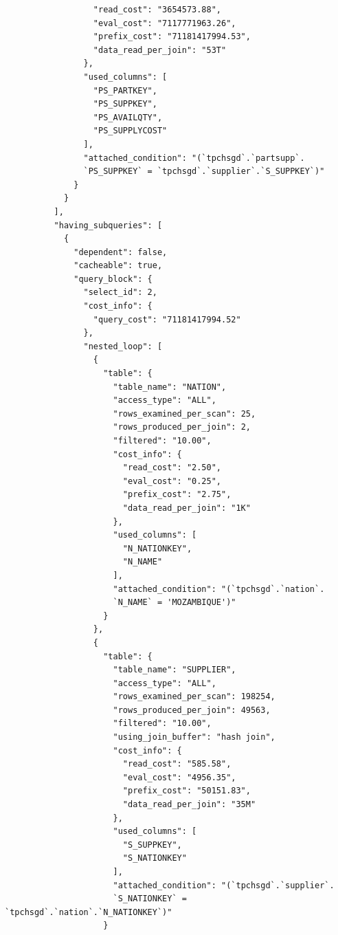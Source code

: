 \documentclass{article}
\begin{document}
\begin{lstlisting}
                  "read_cost": "3654573.88",
                  "eval_cost": "7117771963.26",
                  "prefix_cost": "71181417994.53",
                  "data_read_per_join": "53T"
                },
                "used_columns": [
                  "PS_PARTKEY",
                  "PS_SUPPKEY",
                  "PS_AVAILQTY",
                  "PS_SUPPLYCOST"
                ],
                "attached_condition": "(`tpchsgd`.`partsupp`.
                `PS_SUPPKEY` = `tpchsgd`.`supplier`.`S_SUPPKEY`)"
              }
            }
          ],
          "having_subqueries": [
            {
              "dependent": false,
              "cacheable": true,
              "query_block": {
                "select_id": 2,
                "cost_info": {
                  "query_cost": "71181417994.52"
                },
                "nested_loop": [
                  {
                    "table": {
                      "table_name": "NATION",
                      "access_type": "ALL",
                      "rows_examined_per_scan": 25,
                      "rows_produced_per_join": 2,
                      "filtered": "10.00",
                      "cost_info": {
                        "read_cost": "2.50",
                        "eval_cost": "0.25",
                        "prefix_cost": "2.75",
                        "data_read_per_join": "1K"
                      },
                      "used_columns": [
                        "N_NATIONKEY",
                        "N_NAME"
                      ],
                      "attached_condition": "(`tpchsgd`.`nation`.
                      `N_NAME` = 'MOZAMBIQUE')"
                    }
                  },
                  {
                    "table": {
                      "table_name": "SUPPLIER",
                      "access_type": "ALL",
                      "rows_examined_per_scan": 198254,
                      "rows_produced_per_join": 49563,
                      "filtered": "10.00",
                      "using_join_buffer": "hash join",
                      "cost_info": {
                        "read_cost": "585.58",
                        "eval_cost": "4956.35",
                        "prefix_cost": "50151.83",
                        "data_read_per_join": "35M"
                      },
                      "used_columns": [
                        "S_SUPPKEY",
                        "S_NATIONKEY"
                      ],
                      "attached_condition": "(`tpchsgd`.`supplier`.
                      `S_NATIONKEY` = `tpchsgd`.`nation`.`N_NATIONKEY`)"
                    }

\end{lstlisting}
\end{document}
